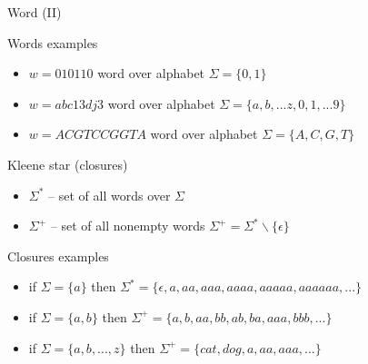 \documentclass{beamer}
\begin{document}
\begin{frame}{Word (II)}

\begin{exampleblock}{Words examples}
\begin{itemize}
\item $w = 010110$ word over alphabet $\Sigma = \{0, 1\}$
\item $w = abc13dj3$ word over alphabet $\Sigma = \{a, b, ...z, 0, 1, ...9\}$
\item $w = ACGTCCGGTA$ word over alphabet $\Sigma = \{A, C, G, T\}$
\end{itemize}
\end{exampleblock}

\begin{block}{Kleene star (closures)}
\begin{itemize}
\item $\Sigma^{\ast}$ -- set of all words over $\Sigma$
\item $\Sigma^{+}$ -- set of all nonempty words $\Sigma^+=\Sigma^*\backslash\{\epsilon\}$
\end{itemize}
\end{block}

\begin{exampleblock}{Closures examples}
\begin{itemize}
\item if $\Sigma = \{a\}$ then $\Sigma^{\ast} = \{\epsilon, a, aa, aaa, aaaa, aaaaa, aaaaaa, ...\}$
\item if $\Sigma = \{a, b\}$ then $\Sigma^{+} = \{a, b, aa, bb, ab, ba, aaa, bbb, ...\}$
\item if $\Sigma = \{a, b, ..., z\}$ then $\Sigma^{+} = \{cat, dog, a, aa, aaa, ...\}$
\end{itemize}
\end{exampleblock}

\end{frame}
\end{document}
